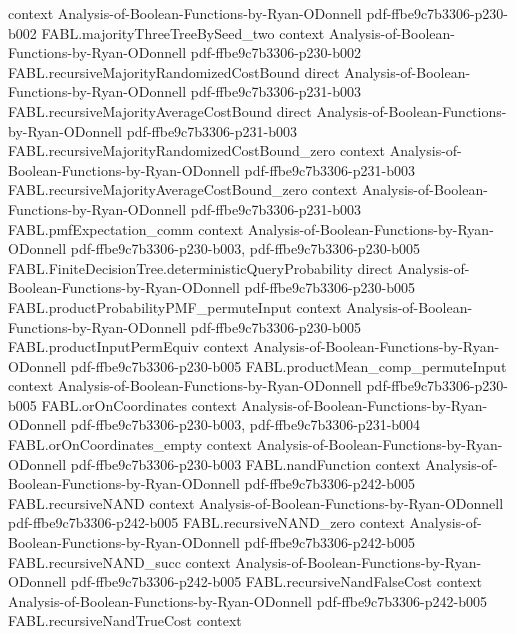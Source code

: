 \begin{theorem}
  {context}
  {Analysis-of-Boolean-Functions-by-Ryan-ODonnell}
  {pdf-ffbe9c7b3306-p230-b002}
\proofstep
  {FABL.majorityThreeTreeBySeed_two}
  {context}
  {Analysis-of-Boolean-Functions-by-Ryan-ODonnell}
  {pdf-ffbe9c7b3306-p230-b002}
\proofstep
  {FABL.recursiveMajorityRandomizedCostBound}
  {direct}
  {Analysis-of-Boolean-Functions-by-Ryan-ODonnell}
  {pdf-ffbe9c7b3306-p231-b003}
\proofstep
  {FABL.recursiveMajorityAverageCostBound}
  {direct}
  {Analysis-of-Boolean-Functions-by-Ryan-ODonnell}
  {pdf-ffbe9c7b3306-p231-b003}
\proofstep
  {FABL.recursiveMajorityRandomizedCostBound_zero}
  {context}
  {Analysis-of-Boolean-Functions-by-Ryan-ODonnell}
  {pdf-ffbe9c7b3306-p231-b003}
\proofstep
  {FABL.recursiveMajorityAverageCostBound_zero}
  {context}
  {Analysis-of-Boolean-Functions-by-Ryan-ODonnell}
  {pdf-ffbe9c7b3306-p231-b003}
\proofstep
  {FABL.pmfExpectation_comm}
  {context}
  {Analysis-of-Boolean-Functions-by-Ryan-ODonnell}
  {pdf-ffbe9c7b3306-p230-b003,
    pdf-ffbe9c7b3306-p230-b005}
\proofstep
  {FABL.FiniteDecisionTree.deterministicQueryProbability}
  {direct}
  {Analysis-of-Boolean-Functions-by-Ryan-ODonnell}
  {pdf-ffbe9c7b3306-p230-b005}
\proofstep
  {FABL.productProbabilityPMF_permuteInput}
  {context}
  {Analysis-of-Boolean-Functions-by-Ryan-ODonnell}
  {pdf-ffbe9c7b3306-p230-b005}
\proofstep
  {FABL.productInputPermEquiv}
  {context}
  {Analysis-of-Boolean-Functions-by-Ryan-ODonnell}
  {pdf-ffbe9c7b3306-p230-b005}
\proofstep
  {FABL.productMean_comp_permuteInput}
  {context}
  {Analysis-of-Boolean-Functions-by-Ryan-ODonnell}
  {pdf-ffbe9c7b3306-p230-b005}
\proofstep
  {FABL.orOnCoordinates}
  {context}
  {Analysis-of-Boolean-Functions-by-Ryan-ODonnell}
  {pdf-ffbe9c7b3306-p230-b003,
    pdf-ffbe9c7b3306-p231-b004}
\proofstep
  {FABL.orOnCoordinates_empty}
  {context}
  {Analysis-of-Boolean-Functions-by-Ryan-ODonnell}
  {pdf-ffbe9c7b3306-p230-b003}
\proofstep
  {FABL.nandFunction}
  {context}
  {Analysis-of-Boolean-Functions-by-Ryan-ODonnell}
  {pdf-ffbe9c7b3306-p242-b005}
\proofstep
  {FABL.recursiveNAND}
  {context}
  {Analysis-of-Boolean-Functions-by-Ryan-ODonnell}
  {pdf-ffbe9c7b3306-p242-b005}
\proofstep
  {FABL.recursiveNAND_zero}
  {context}
  {Analysis-of-Boolean-Functions-by-Ryan-ODonnell}
  {pdf-ffbe9c7b3306-p242-b005}
\proofstep
  {FABL.recursiveNAND_succ}
  {context}
  {Analysis-of-Boolean-Functions-by-Ryan-ODonnell}
  {pdf-ffbe9c7b3306-p242-b005}
\proofstep
  {FABL.recursiveNandFalseCost}
  {context}
  {Analysis-of-Boolean-Functions-by-Ryan-ODonnell}
  {pdf-ffbe9c7b3306-p242-b005}
\proofstep
  {FABL.recursiveNandTrueCost}
  {context}

\end{theorem}
